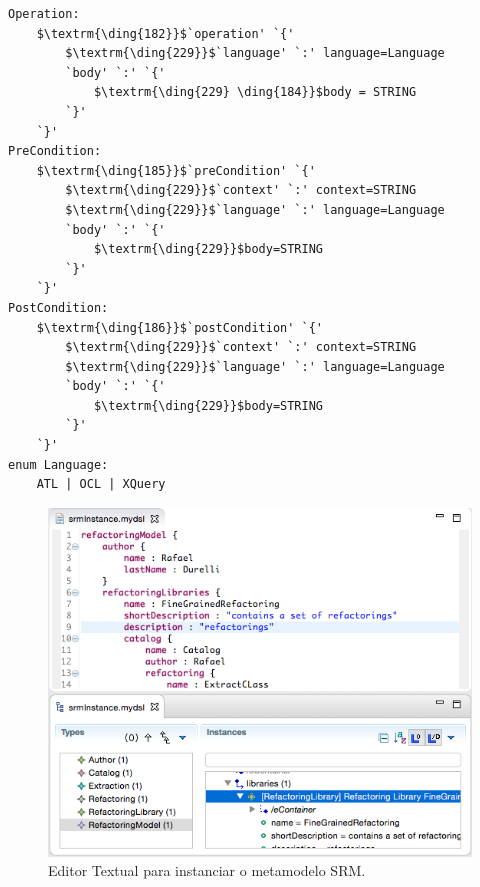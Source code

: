 \begin{lstlisting}[language=Xtext, frame=single, basicstyle=\scriptsize, mathescape=true, label={lst:dsl_part_5}, caption={Gramática da DSL - parte 5}]
Operation: 
	$\textrm{\ding{182}}$`operation' `{'
		$\textrm{\ding{229}}$`language' `:' language=Language
		`body' `:' `{'
			$\textrm{\ding{229} \ding{184}}$body = STRING
		`}'
	`}'
PreCondition: 
	$\textrm{\ding{185}}$`preCondition' `{'
		$\textrm{\ding{229}}$`context' `:' context=STRING
		$\textrm{\ding{229}}$`language' `:' language=Language
		`body' `:' `{' 
			$\textrm{\ding{229}}$body=STRING	
		`}'
	`}'
PostCondition: 
	$\textrm{\ding{186}}$`postCondition' `{'
		$\textrm{\ding{229}}$`context' `:' context=STRING
		$\textrm{\ding{229}}$`language' `:' language=Language
		`body' `:' `{' 
			$\textrm{\ding{229}}$body=STRING	
		`}'
	`}'
enum Language: 
	ATL | OCL | XQuery
\end{lstlisting}


\begin{figure}[!h]
	\centering
	\caption{Editor Textual para instanciar o metamodelo SRM.}
	\label{fig:editor_SRM_metamodel_ECORE}
	\includegraphics[scale=0.7]{images/dsl_SRM_ECORE}
	\fautor
\end{figure}

